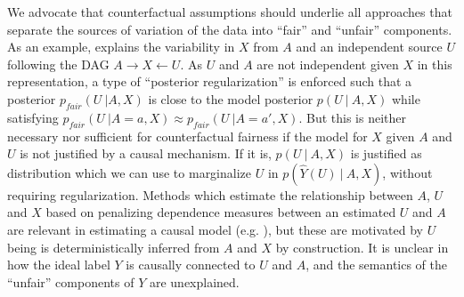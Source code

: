 We advocate that counterfactual assumptions should underlie all
approaches that separate the sources of variation of the data into
``fair'' and ``unfair'' components. As an example,
\citet{louizos2015variational} explains the variability in $X$ from
$A$ and an independent source $U$ following the DAG
$A \rightarrow X \leftarrow U$. As $U$ and $A$ are not independent
given $X$ in this representation, a type of ``posterior
regularization'' \citep{ganchev:10} is enforced such that a posterior
$p_{fair}(U\ | A, X)$ is close to the model posterior $p(U\ |\ A, X)$
while satisfying
$p_{fair}(U\ | A = a, X) \approx p_{fair}(U\ | A = a', X)$. But this
is neither necessary nor sufficient for counterfactual fairness if the
model for $X$ given $A$ and $U$ is not justified by a causal
mechanism. If it is, $p(U\ |\ A, X)$ is justified as distribution
which we can use to marginalize $U$ in $p(\hat Y(U)\ |\ A, X)$, without requiring regularization.
%
Methods which estimate the
relationship between $A$, $U$ and $X$ based on penalizing dependence
measures between an estimated $U$ and $A$ are relevant in estimating a
causal model (e.g. \citet{mooij:09}), but these
are motivated by  $U$ being is deterministically inferred
from $A$ and $X$ by construction. It is unclear in
\citet{louizos2015variational} how the ideal label $Y$ is causally
connected to $U$ and $A$, and the semantics of the ``unfair''
components of $Y$ are  unexplained.


